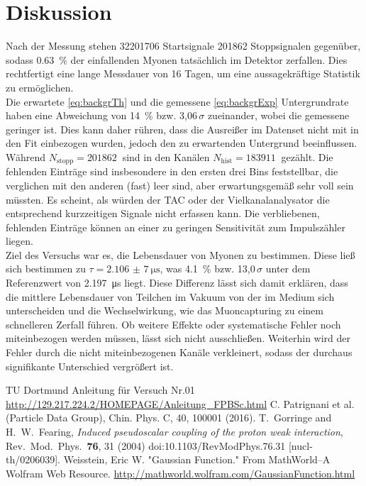 \section{Diskussion}
Nach der Messung stehen \SI{32201706}{} Startsignale \SI{201862}{} Stoppsignalen gegenüber, sodass \SI{0,63}{\%} der einfallenden Myonen tatsächlich
im Detektor zerfallen. Dies rechtfertigt eine lange Messdauer von 16 Tagen, um eine aussagekräftige Statistik zu ermöglichen. \\
\noindent Die erwartete \eqref{eq:backgrTh} und die gemessene \eqref{eq:backgrExp} Untergrundrate haben eine Abweichung von \SI{14}{\%} bzw.
3,06\,$\sigma$ zueinander,
wobei die gemessene geringer ist. Dies kann daher rühren, dass die Ausreißer im Datenset nicht mit in den Fit einbezogen wurden, jedoch den zu
erwartenden Untergrund beeinflussen. \\
\noindent Während $N_\text{stopp} = \SI{201862}{}$ sind in den Kanälen $N_\text{hist} = \SI{183911}{}$ gezählt. Die fehlenden Einträge sind insbesondere
in den ersten drei Bins feststellbar, die verglichen mit den anderen (fast) leer sind, aber erwartungsgemäß sehr voll sein müssten. Es scheint,
als würden der TAC oder der Vielkanalanalysator die entsprechend kurzzeitigen Signale nicht erfassen kann. Die verbliebenen, fehlenden Einträge
können an einer zu geringen Sensitivität zum Impulszähler liegen.\\
\noindent Ziel des Versuchs war es, die Lebensdauer von Myonen zu bestimmen. Diese ließ sich bestimmen zu $\tau = \SI{2,106(7)}{\micro\second}$,
was \SI{4,1}{\%} bzw. 13,0\,$\sigma$ unter dem Referenzwert \cite{pdg} von \SI{2,197}{\micro\second} liegt. Diese Differenz lässt sich damit erklären, dass die mittlere
Lebensdauer von Teilchen im Vakuum von der im Medium sich unterscheiden und die Wechselwirkung, wie das Muoncapturing \cite{mCapture}
zu einem schnelleren Zerfall führen. Ob weitere Effekte oder systematische Fehler noch miteinbezogen werden müssen, lässt sich nicht ausschließen.
Weiterhin wird der Fehler durch die nicht miteinbezogenen Kanäle verkleinert, sodass der durchaus signifikante
Unterschied vergrößert ist.


\newpage
 \begin{thebibliography}{WissOnl}
 	 TU Dortmund Anleitung für Versuch Nr.01 \url{http://129.217.224.2/HOMEPAGE/Anleitung_FPBSc.html}
 	 C. Patrignani et al. (Particle Data Group), Chin. Phys. C, 40, 100001 (2016).
   	   T.~Gorringe and H.~W.~Fearing,
    \textit{Induced pseudoscalar coupling of the proton weak interaction},
    Rev.\ Mod.\ Phys.\  {\bf 76}, 31 (2004)
    doi:10.1103/RevModPhys.76.31
    [nucl-th/0206039].
     Weisstein, Eric W. "Gaussian Function." From MathWorld--A Wolfram Web Resource. \url{http://mathworld.wolfram.com/GaussianFunction.html }
	\end{thebibliography}

